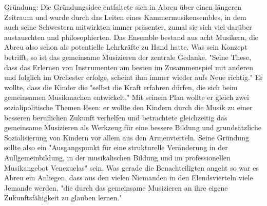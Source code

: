 Gründung: Die Gründungsidee entfaltete sich in Abreu über einen längeren
Zeitraum und wurde durch das Leiten eines Kammermusikensembles, in dem auch
seine Schwestern mitwirkten immer präsenter, zumal sie sich viel darüber
austauschten und philosophierten. Das Ensemble bestand aus acht Musikern, die
Abreu also schon als potentielle Lehrkräfte zu Hand hatte.
\autocite[34]{kaufmann:el_sistema} Was sein Konzept betrifft, so ist das
gemeinsame Musizieren der zentrale Gedanke. "Seine These, dass das Erlernen von
Instrumenten am besten im Zusammenspiel mit anderen und folglich im Orchester
erfolge, scheint ihm immer wieder aufs Neue
richtig."\autocite[34]{kaufmann:el_sistema} Er wollte, dass die Kinder die
"selbst die Kraft erfahren dürfen, die sich beim gemeinsamen Musikmachen
entwickelt."\autocite[34]{kaufmann:el_sistema} Mit seinem Plan wollte er gleich
zwei sozialipolitische Themen lösen: er wollte den Kindern durch die Musik zu
einer besseren beruflichen Zukunft verhelfen und betrachtete gleichzeitig das
gemeinsame Musizieren als Werkzeug für eine bessere Bildung und grundsätzliche
Sozialisierung von Kindern vor allem aus den Armenvierteln. Seine Gründung
sollte also ein "Ausgangspunkt für eine strukturelle Veränderung in der
Aullgemeinbildung, in der musikalischen Bildung und im professionellen
Musikangebot Venezuelas" sein. \autocite[38]{kaufmann:el_sistema} Was gerade die
Benachteiligten angeht so war es Abreu ein Anliegen, dass aus den vielen
Niemanden in den Elendsvierteln viele Jemande werden, "die durch das gemeinsame
Musizieren an ihre eigene Zukunftsfähigkeit zu glauben
lernen."\autocite[39]{kaufmann:el_sistema}


